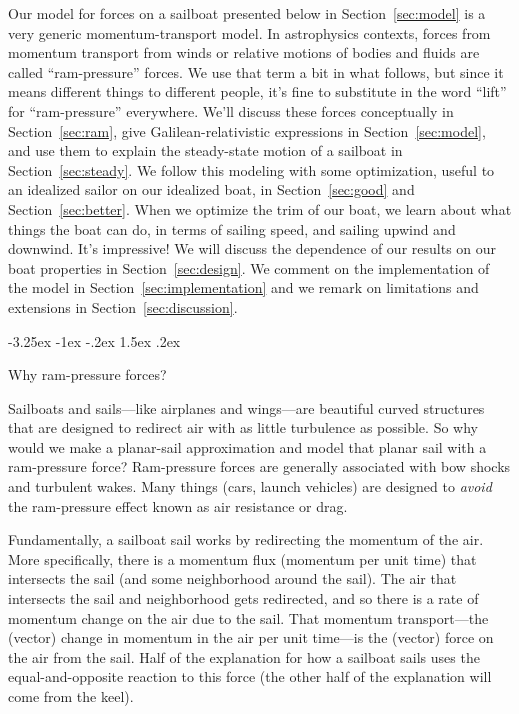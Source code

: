 \documentclass[letterpaper]{article}
\makeatletter
\newcommand{\secref}[1]{Section~\ref{#1}}
\renewcommand\section{\@startsection {section}{1}{\z@}%
  {-3.25ex \@plus -1ex \@minus -.2ex}%
  {1.5ex \@plus .2ex}%
  {\raggedright\normalfont\large\bfseries}}
\makeatother
\begin{document}
Our model for forces on a sailboat presented below in \secref{sec:model} is a very generic momentum-transport model.
In astrophysics contexts, forces from momentum transport from winds or relative motions of bodies and fluids are called ``ram-pressure'' forces.
We use that term a bit in what follows, but since it means different things to different people, it's fine to substitute in the word ``lift'' for ``ram-pressure'' everywhere.
We'll discuss these forces conceptually in \secref{sec:ram}, give Galilean-relativistic expressions in \secref{sec:model}, and use them to explain the steady-state motion of a sailboat in \secref{sec:steady}.
We follow this modeling with some optimization, useful to an idealized sailor on our idealized boat, in \secref{sec:good} and \secref{sec:better}.
When we optimize the trim of our boat, we learn about what things the boat can do, in terms of sailing speed, and sailing upwind and downwind.
It's impressive!
We will discuss the dependence of our results on our boat properties in \secref{sec:design}.
We comment on the implementation of the model in \secref{sec:implementation} and we remark on limitations and extensions in \secref{sec:discussion}.

\section{Why ram-pressure forces?}\label{sec:ram}

Sailboats and sails---like airplanes and wings---are beautiful curved structures that are designed to redirect air with as little turbulence as possible.
So why would we make a planar-sail approximation and model that planar sail with a ram-pressure force?
Ram-pressure forces are generally associated with bow shocks and turbulent wakes.
Many things (cars, launch vehicles) are designed to \emph{avoid} the ram-pressure effect known as air resistance or drag.

Fundamentally, a sailboat sail works by redirecting the momentum of the air.
More specifically, there is a momentum flux (momentum per unit time) that intersects the sail (and some neighborhood around the sail).
The air that intersects the sail and neighborhood gets redirected, and so there is  a rate of momentum change on the air due to the sail.
That momentum transport---the (vector) change in momentum in the air per unit time---is the (vector) force on the air from the sail.
Half of the explanation for how a sailboat sails uses the equal-and-opposite reaction to this force (the other half of the explanation will come from the keel).
\end{document}
